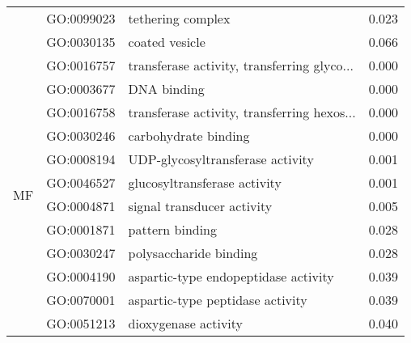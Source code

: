 \begin{longtable}{lllr}
   & GO:0099023 &                            tethering complex &         0.023 \\
   & GO:0030135 &                               coated vesicle &         0.066 \\
\cline{1-4}
\multirow{12}{*}{MF} & GO:0016757 &  transferase activity, transferring glyco... &         0.000 \\
   & GO:0003677 &                                  DNA binding &         0.000 \\
   & GO:0016758 &  transferase activity, transferring hexos... &         0.000 \\
   & GO:0030246 &                         carbohydrate binding &         0.000 \\
   & GO:0008194 &             UDP-glycosyltransferase activity &         0.001 \\
   & GO:0046527 &                 glucosyltransferase activity &         0.001 \\
   & GO:0004871 &                   signal transducer activity &         0.005 \\
   & GO:0001871 &                              pattern binding &         0.028 \\
   & GO:0030247 &                       polysaccharide binding &         0.028 \\
   & GO:0004190 &         aspartic-type endopeptidase activity &         0.039 \\
   & GO:0070001 &             aspartic-type peptidase activity &         0.039 \\
   & GO:0051213 &                         dioxygenase activity &         0.040 \\
\end{longtable}
